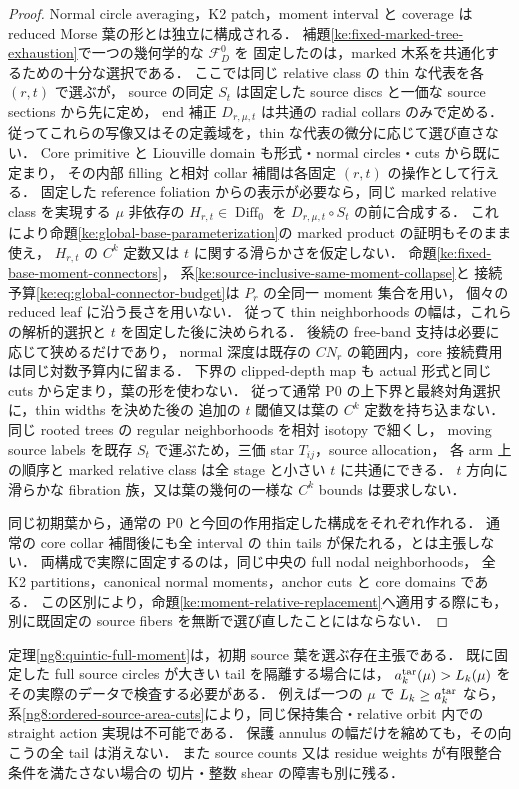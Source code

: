 \begin{proof}
Normal circle averaging，K2 patch，moment interval と coverage は
reduced Morse 葉の形とは独立に構成される．
補題\ref{ke:fixed-marked-tree-exhaustion}で一つの幾何学的な $\mathcal F_D^0$ を
固定したのは，marked 木系を共通化するための十分な選択である．
ここでは同じ relative class の thin な代表を各 $(r,t)$ で選ぶが，
source の同定 $S_t$ は固定した source discs と一価な source sections から先に定め，
end 補正 $D_{r,\mu,t}$ は共通の radial collars のみで定める．
従ってこれらの写像又はその定義域を，thin な代表の微分に応じて選び直さない．
Core primitive と Liouville domain も形式・normal circles・cuts から既に定まり，
その内部 filling と相対 collar 補間は各固定 $(r,t)$ の操作として行える．
固定した reference foliation からの表示が必要なら，同じ marked relative class を実現する
$\mu$ 非依存の $H_{r,t}\in\operatorname{Diff}_0$ を $D_{r,\mu,t}\circ S_t$ の前に合成する．
これにより命題\ref{ke:global-base-parameterization}の marked product の証明もそのまま使え，
$H_{r,t}$ の $C^k$ 定数又は $t$ に関する滑らかさを仮定しない．
命題\ref{ke:fixed-base-moment-connectors}，
系\ref{ke:source-inclusive-same-moment-collapse}と
接続予算\eqref{ke:eq:global-connector-budget}は $P_r$ の全同一 moment 集合を用い，
個々の reduced leaf に沿う長さを用いない．
従って thin neighborhoods の幅は，これらの解析的選択と $t$ を固定した後に決められる．
後続の free-band 支持は必要に応じて狭めるだけであり，
normal 深度は既存の $CN_r$ の範囲内，core 接続費用は同じ対数予算内に留まる．
下界の clipped-depth map も actual 形式と同じ cuts から定まり，葉の形を使わない．
従って通常 P0 の上下界と最終対角選択に，thin widths を決めた後の
追加の $t$ 閾値又は葉の $C^k$ 定数を持ち込まない．
同じ rooted trees の regular neighborhoods を相対 isotopy で細くし，
moving source labels を既存 $S_t$ で運ぶため，三価 star $T_{ij}$，source allocation，
各 arm 上の順序と marked relative class は全 stage と小さい $t$ に共通にできる．
$t$ 方向に滑らかな fibration 族，又は葉の幾何の一様な $C^k$ bounds は要求しない．

同じ初期葉から，通常の P0 と今回の作用指定した構成をそれぞれ作れる．
通常の core collar 補間後にも全 interval の thin tails が保たれる，とは主張しない．
両構成で実際に固定するのは，同じ中央の full nodal neighborhoods，
全 K2 partitions，canonical normal moments，anchor cuts と core domains である．
この区別により，命題\ref{ke:moment-relative-replacement}へ適用する際にも，
別に既固定の source fibers を無断で選び直したことにはならない．
\end{proof}

\begin{remark}
定理\ref{ng8:quintic-full-moment}は，初期 source 葉を選ぶ存在主張である．
既に固定した full source circles が大きい tail を隔離する場合には，
$a_k^{\rm tar}(\mu)>L_k(\mu)$ をその実際のデータで検査する必要がある．
例えば一つの $\mu$ で $L_k\ge a_k^{\rm tar}$ なら，
系\ref{ng8:ordered-source-area-cuts}により，同じ保持集合・relative orbit 内での
straight action 実現は不可能である．
保護 annulus の幅だけを縮めても，その向こうの全 tail は消えない．
また source counts 又は residue weights が有限整合条件を満たさない場合の
切片・整数 shear の障害も別に残る．
\end{remark}
